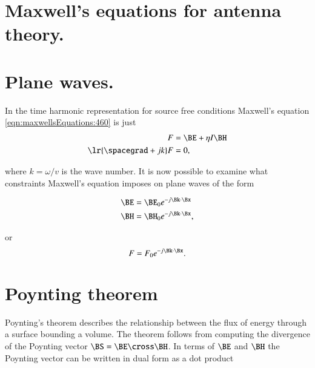 %
%
\section{Maxwell's equations for antenna theory.}

\makedigression{

}

\section{Plane waves.}

In the time harmonic representation for source free conditions Maxwell's equation \cref{eqn:maxwellsEquations:460} is just
\begin{dmath}\label{eqn:maxwellsEquations:560}
\begin{aligned}
F &= \BE + \eta I \BH \\
\lr{ \spacegrad + j k } F &= 0,
\end{aligned}
\end{dmath}

where \( k = \omega/v \) is the wave number.  It is now possible to examine what constraints Maxwell's equation imposes on plane waves of the form

\begin{dmath}\label{eqn:maxwellsEquations:580}
\begin{aligned}
\BE &= \BE_0 e^{-j \Bk \cdot \Bx} \\
\BH &= \BH_0 e^{-j \Bk \cdot \Bx},
\end{aligned}
\end{dmath}

or
\begin{dmath}\label{eqn:maxwellsEquations:600}
F = F_0 e^{-j \Bk \cdot \Bx}.
\end{dmath}



\section{Poynting theorem}

Poynting's theorem describes the relationship between the flux of energy through a surface bounding a volume.
The theorem follows from computing the divergence of the Poynting vector \( \BS = \BE \cross \BH \).  In terms of \( \BE \) and \( \BH \) the Poynting vector can be written in dual form as a dot product

